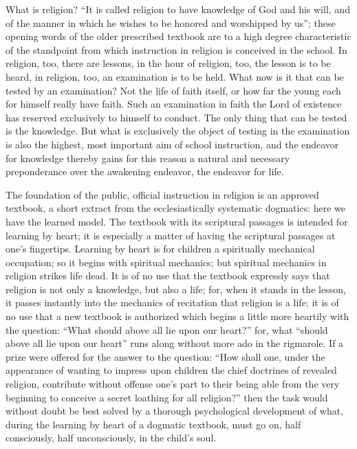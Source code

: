 \documentclass[12pt,a4paper,openany]{book}
\newcommand{\opage}[1]{\marginnote{\footnotesize\textit{[#1]}}}
\begin{document}
What is religion? ``It is called religion to
have knowledge of God and his will, and of the
manner in which he wishes to be honored and worshipped by us''; these
opening words of the older prescribed textbook are to a high
degree characteristic of the standpoint from which instruction in religion
is conceived in the school. In religion, too,
\setcounter{footnote}{0}%
\opage{312}there are lessons, in the hour of religion, too, the lesson is to be heard,
in religion, too, an examination is to be held.
What now is it that can be tested by an examination? Not
the life of faith itself, or how far the young each for himself really
have faith. Such an examination in faith the Lord of existence
has reserved exclusively to himself to conduct.
The only thing that can be tested is the knowledge.
But what is exclusively the object of testing in the examination
is also the highest, most important aim of school instruction, and the endeavor for knowledge thereby gains
for this reason a natural and necessary preponderance over
the awakening endeavor, the endeavor for life.

The foundation of the public, official instruction in religion
is an approved textbook, a short extract from the
ecclesiastically systematic dogmatics: here we have the learned
model. The textbook with its scriptural passages is intended
for learning by heart; it is especially a matter of having the scriptural passages
at one's fingertips. Learning by heart is for children
a spiritually mechanical occupation; so it begins with
spiritual mechanics; but spiritual mechanics in religion strikes
life dead. It is of no use that the textbook expressly
says that religion is not only a knowledge, but
also a life; for, when it stands in the lesson, it passes
instantly into the mechanics of recitation that religion is
a life; it is of no use that a new textbook is authorized
which begins a little more heartily with the question:
``What should above all lie upon our heart?'' for,
what ``should above all lie upon our heart'' runs
along without more ado in the rigmarole. If a
prize were offered for the answer to the question: ``How
shall one, under the appearance of wanting to impress upon children
\setcounter{footnote}{0}%
\opage{313}the chief doctrines of revealed religion, contribute without offense
one's part to their being able from the very beginning
to conceive a secret loathing for all religion?'' then the task would
without doubt be best solved by a thorough psychological
development of what, during the learning by heart of a
dogmatic textbook, must go on, half consciously, half unconsciously,
in the child's soul.
\end{document}
